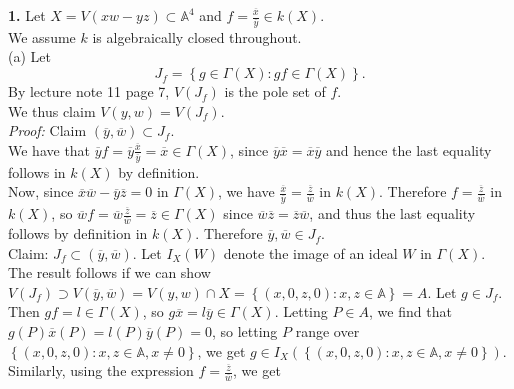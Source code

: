 \documentclass[a4paper]{article}
\begin{document}
    \textbf{1.} Let $X = V\left( xw - yz \right) \subset 
    \mathbb{A}^{4}$ and $f = \frac{\overline{x}}{\overline{y}}
    \in k(X)$.\\
    We assume $k$ is algebraically closed throughout.\\
    (a) Let
    \[
    J_f = \left\{ g \in \Gamma (X)  \colon g f
    \in \Gamma (X) \right\} .
    \] 
    By lecture note 11 page 7, $V(J_f)$ is the pole set of $f$.\\
    \linebreak
    We thus claim $V(y,w) = V\left( J_f \right) $.\\
    \linebreak
    \textit{Proof:} Claim $\left( \overline{y}, \overline{w} \right) \subset   J_f$.\\
    We have that $\overline{y} f = \overline{y} \frac{\overline{x}}{\overline{y}}
    = \overline{x} \in \Gamma(X)$, since $\overline{y} \overline{x} = \overline{x}
    \overline{y}$ and hence the last equality follows in $k(X)$ by
    definition.\\
    Now, since $\overline{x} \overline{w} - \overline{y} \overline{z} = 0$ in $\Gamma(X)$, we have
    $\frac{\overline{x}}{\overline{y}}
    = \frac{\overline{z}}{\overline{w}}$ in $k(X)$. Therefore
    $f = \frac{\overline{z}}{\overline{w}}$ in $k(X)$, so
    $\overline{w} f = \overline{w} \frac{\overline{z}}{\overline{w}}
    = \overline{z} \in \Gamma(X)$ since $\overline{w} \overline{z} = \overline{z}
    \overline{w}$, and thus the last equality follows by definition in $k(X)$.
    Therefore
    $\overline{y}, \overline{w} \in J_f$.\\
    \linebreak
    Claim: $J_f \subset \left( \overline{y}, \overline{w} \right) $. Let
    $I_X (W)$ denote the image of an ideal $W$ in $\Gamma(X)$.\\
    The result follows if we can show  $V(J_f) \supset V\left( \overline{y},
    \overline{w} \right) = V(y,w) \cap X = \left\{ (x,0,z,0)  \colon x,z \in 
\mathbb{A} \right\} = A $. Let $g \in J_f$. Then $gf = l \in \Gamma(X)$, so 
$g \overline{x} = l \overline{y} \in \Gamma(X)$. Letting $P \in A$, we find
that $g(P) \overline{x}(P) = l\left( P \right) \overline{y}(P) = 0$, so
letting $P$ range over $\left\{ \left( x,0,z,0 \right)  \colon x,z \in
    \mathbb{A}, x \neq 0 \right\} $, we get $g \in I_X \left( 
\left\{ \left( x, 0, z, 0 \right)  \colon x,z \in \mathbb{A}, x\neq 0 \right\}
\right)  $.\\
Similarly, using the expression $f = \frac{\overline{z}}{\overline{w}}$, we get
\end{document}
